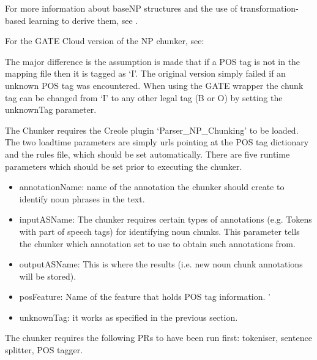 For more information about baseNP structures and the use of
transformation-based learning to derive them, see \cite{Ramshaw95}.

For the GATE Cloud version of the NP chunker, see: \\


The major difference is the assumption is made that if a POS tag
is not in the mapping file then it is tagged as `I'. The original
version simply failed if an unknown POS tag was encountered.
When using the GATE wrapper the chunk tag can be changed from `I'
to any other legal tag (B or O) by setting the unknownTag parameter.


The Chunker requires the Creole plugin `Parser\_NP\_Chunking' to be loaded.
The two loadtime parameters are simply urls pointing at the POS tag dictionary
and the rules file, which should be set automatically.  There are five runtime
parameters which should be set prior to executing the chunker.

\begin{itemize}
\item annotationName: name of the annotation the chunker should create to
          identify noun phrases in the text.

\item inputASName: The chunker requires certain types of annotations (e.g.
          Tokens with part of speech tags) for identifying noun chunks.  This 
          parameter tells the chunker which annotation set to use to obtain such
          annotations from.

\item outputASName: This is where the results (i.e. new noun chunk 
         annotations will be stored).

\item posFeature: Name of the feature that holds POS tag information.
'
\item unknownTag: it works as specified in the previous section.
\end{itemize}


The chunker requires the following PRs to have been run first: tokeniser,
sentence splitter, POS tagger.


